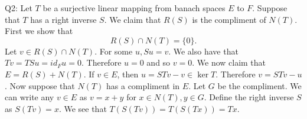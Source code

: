 \documentclass[letterpaper]{article}
\begin{document}
 \noindent Q2: 
Let $T$ be a surjective linear mapping from banach spaces $E$ to $F$. Suppose that $T$ has a right inverse $S$. We claim that $R(S)$ is the compliment of $N(T)$. First we show that 
$$R(S) \cap N(T) = \{0\}. $$ Let $v\in R(S) \cap N(T)$. For some $u, Su = v$. We also have that $Tv = TSu = id_F u =0.$ Therefore $u = 0$ and so $v=0$. 
We now claim that $E = R(S)+N(T)$. If $v\in E$, then $u = STv - v \in \ker T$. Therefore $v = STv - u$. 
Now suppose that $N(T)$ has a compliment in $E$. Let $G$ be the compliment. We can write any $v\in E$ as $v = x+y$ for $x\in N(T), y\in G$. Define the right inverse $S$ as $S(Tv) = x$. 
We see that $T(S(Tv)) = T(S(Tx)) = Tx.$ 
\end{document}
